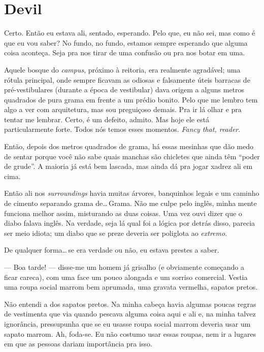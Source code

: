 \chapter{Devil}

Certo. Então eu estava ali, sentado, esperando. Pelo que, eu não sei, mas como é que eu vou saber? No fundo, no fundo, estamos sempre esperando que alguma coisa aconteça. Seja pra nos tirar de uma confusão ou pra nos botar em uma.

Aquele bosque do \emph{campus}, próximo à reitoria, era realmente agradável; uma rótula principal, onde sempre ficavam as odiosas e falsamente úteis barracas de pré-ves\-ti\-bu\-la\-res (durante a época de vestibular) dava origem a alguns metros quadrados de pura grama em frente a um prédio bonito. Pelo que me lembro tem algo a ver com arquitetura, mas sou preguiçoso demais. Pra ir lá olhar e pra tentar me lembrar. Certo, é um defeito, admito. Mas hoje ele está particularmente forte. Todos nós temos esses momentos. \foreignlanguage{english}{\emph{Fancy that, reader}}.

Então, depois dos metros quadrados de grama, há essas mesinhas que dão medo de sentar porque você não sabe quais manchas são chicletes que ainda têm ``poder de grude''. A maioria já está bem lascada, mas ainda dá pra jogar xadrez ali em cima.

Então ali nos \emph{surroundings} havia muitas árvores, banquinhos legais e um caminho de cimento separando grama de\ldots\,Grama. Não me culpe pelo inglês, minha mente funciona melhor assim, misturando as duas coisas. Uma vez ouvi dizer que o diabo falava inglês. Na verdade, seja lá qual foi a lógica por detrás disso, parecia ser meio idiota; um diabo que se preze deveria ser poliglota ao \emph{extremo}.

De qualquer forma\ldots\,se era verdade ou não, eu estava prestes a saber.

--- Boa tarde! --- disse-me um homem já grisalho (e obviamente começando a ficar careca), com uma face um pouco alongada e um sorriso comercial. Vestia uma roupa social marrom bem aprumada, uma gravata vermelha, sapatos pretos.

Não entendi a dos sapatos pretos. Na minha cabeça havia algumas poucas regras de vestimenta que via quando pescava alguma coisa aqui e ali e, na minha talvez ignorância, pressupunha que se eu usasse roupa social marrom deveria usar um sapato marrom. Ah, foda-se. Eu não costumo usar essas roupas, nem ir a lugares em que as pessoas dariam importância pra isso.

